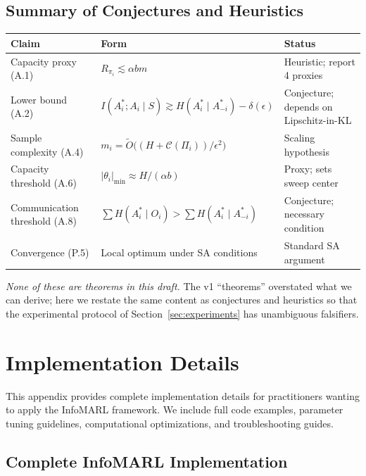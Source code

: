\documentclass[10pt, letterpaper]{article}
\begin{document}
\subsection{Summary of Conjectures and Heuristics}

\begin{center}
\small
\begin{tabular}{lll}
\toprule
\textbf{Claim} & \textbf{Form} & \textbf{Status} \\
\midrule
Capacity proxy (A.1) & $R_{\pi_i} \lesssim \alpha b m$ & Heuristic; report 4 proxies \\
Lower bound (A.2) & $I(A_i^*; A_i\mid S) \gtrsim H(A_i^*\mid A_{-i}^*) - \delta(\epsilon)$ & Conjecture; depends on Lipschitz-in-KL \\
Sample complexity (A.4) & $m_i = \tilde{O}\bigl((H + \mathcal{C}(\Pi_i))/\epsilon^2\bigr)$ & Scaling hypothesis \\
Capacity threshold (A.6) & $|\theta_i|_\text{min} \approx H/(\alpha b)$ & Proxy; sets sweep center \\
Communication threshold (A.8) & $\sum H(A_i^*\mid O_i) > \sum H(A_i^*\mid A_{-i}^*)$ & Conjecture; necessary condition \\
Convergence (P.5) & Local optimum under SA conditions & Standard SA argument \\
\bottomrule
\end{tabular}
\end{center}

\emph{None of these are theorems in this draft.} The v1 ``theorems'' overstated what we can derive; here we restate the same content as conjectures and heuristics so that the experimental protocol of Section~\ref{sec:experiments} has unambiguous falsifiers.

\section{Implementation Details}
\label{app:impl}

This appendix provides complete implementation details for practitioners wanting to apply the InfoMARL framework. We include full code examples, parameter tuning guidelines, computational optimizations, and troubleshooting guides.

\subsection{Complete InfoMARL Implementation}
\end{document}
